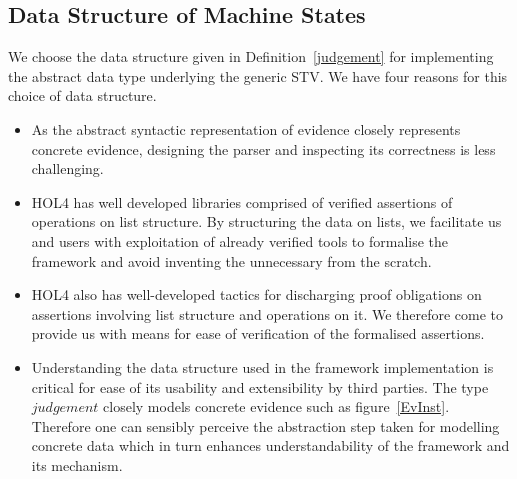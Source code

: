 \documentclass[10pt,conference]{IEEEtran}
\begin{document}
\subsection{Data Structure of Machine States}
\label{MachineData}
 We choose the data structure  given in Definition~\ref{judgement} for implementing the abstract data type underlying the generic STV.  We have four reasons for this choice of data structure. 
 \begin{itemize}
\item As the abstract syntactic representation of evidence closely represents concrete evidence, designing the parser and inspecting  its  correctness is less challenging.  
 \item HOL4 has well developed libraries comprised of verified assertions of operations on list structure. By structuring the data on lists, we facilitate us and users  with exploitation of  already verified tools to formalise the framework and avoid inventing the unnecessary from the scratch. 
 \item HOL4 also has well-developed tactics for discharging proof obligations on assertions involving list structure and operations on it. We therefore come to provide us with means for ease of verification of the formalised assertions.
 \item Understanding the data structure used in the  framework implementation is critical for ease of  its usability and extensibility by third parties.  The type $\mathit{judgement}$ closely models concrete evidence such as figure~\ref{EvInst}. Therefore one can sensibly perceive the  abstraction step taken for modelling  concrete data which in turn enhances understandability of the framework and its mechanism. 
   \end{itemize}
\end{document}
